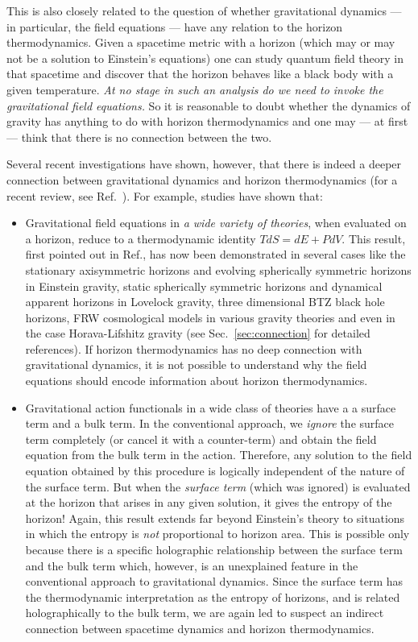 \documentclass[12pt]{iopart}
\begin{document}
This is also closely related to the question of whether gravitational dynamics --- in particular, the field equations --- have any relation to the horizon thermodynamics.
Given a spacetime metric with a horizon (which may or may not be a solution to Einstein's equations)
one can study quantum field theory in that spacetime and discover that the horizon behaves like a black body with a given temperature.  
\textit{At no stage in such an analysis do we need to invoke the gravitational field equations.}
So it is reasonable to doubt whether the dynamics of gravity has anything to do with horizon thermodynamics and one may --- at first --- think that there is no connection between the two.

Several recent investigations have shown, however, that there is indeed a deeper connection between gravitational dynamics and horizon thermodynamics (for a recent review, see Ref.~\cite{tpdialogue}). 
For example, studies have shown that: 
\begin{itemize}
\item 
Gravitational field equations in \textit{a wide variety of theories}, when evaluated on a horizon, reduce to  a thermodynamic identity $TdS=dE+PdV$. This result, first pointed out in Ref.\cite{tdsingr}, has now been demonstrated  in several cases 
like the  stationary
axisymmetric horizons and evolving spherically symmetric horizons
in Einstein gravity, static spherically symmetric
horizons and dynamical apparent horizons in
Lovelock gravity, three dimensional BTZ black hole
horizons, FRW cosmological
models in various gravity
theories and even  in the case Horava-Lifshitz gravity (see Sec.~\ref{sec:connection} for detailed references). 
If horizon thermodynamics has no deep connection with gravitational dynamics, 
it is not possible to understand why the field equations should encode information about horizon thermodynamics.
\item

Gravitational action functionals in a wide class of theories have a a surface term and a bulk term. In the conventional  approach, we \textit{ignore} the surface term completely
(or cancel it with a counter-term) and obtain the field equation
from the bulk term in the action. Therefore, any solution to the field equation obtained 
by this procedure is logically independent of the nature of the surface term.
But  when the \textit{surface term} (which was ignored) is evaluated at the horizon that arises
in any given solution, it  gives the entropy of the horizon! Again, this result extends far beyond Einstein's theory to situations in which the entropy is \textit{not}  proportional to horizon area.
This is possible only because there is a specific holographic relationship \cite{TPhol002,TPgravquantum,ayan}
between the 
surface term and the bulk term which, however, is  an unexplained feature in the conventional
approach to gravitational dynamics.
Since the surface term has the thermodynamic interpretation as the entropy of horizons,
and is related holographically to the bulk term, we are again led to suspect 
an indirect connection between spacetime dynamics and horizon thermodynamics.
\end{itemize}
\end{document}

